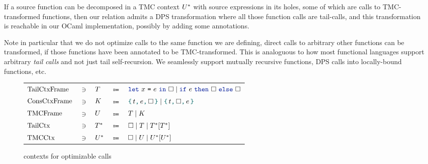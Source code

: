 If a source function can be decomposed in a TMC context $\datalangTMCCtx$ with source expressions in its holes, some of which are calls to TMC-transformed functions, then our relation admits a DPS transformation where all those function calls are tail-calls, and this transformation is reachable in our OCaml implementation, possibly by adding some annotations.

Note in particular that we do not optimize calls to the same function we are defining, direct calls to arbitrary other functions can be transformed, if those functions have been annotated to be TMC-transformed.
This is analoguous to how most functional languages support arbitrary \emph{tail calls} and not just tail self-recursion.
We seamlessly support mutually recursive functions, DPS calls into locally-bound functions, etc.

\begin{figure}[tp]
    \begin{tabular}{lclcl}
            $\datalangTailFrame[]$
            & $\ni$ &
            $\datalangTailFrame$
            & $\Coloneqq$ &
            $\datalangLet {\datalangVar} {\datalangExpr} \datalangCtxHole \mid \datalangIf \datalangExpr \datalangCtxHole \datalangCtxHole$
\\
            $\datalangConsFrame[]$
            & $\ni$ &
            $\datalangConsFrame$
            & $\Coloneqq$ &
            $\datalangBlock \datalangTag \datalangExpr \datalangCtxHole
            \mid \datalangBlock \datalangTag \datalangCtxHole \datalangExpr$
\\
            $\datalangTMCFrame[]$
            & $\ni$ &
            $\datalangTMCFrame$
            & $\Coloneqq$ &
            $\datalangTailFrame
             \mid
             \datalangConsFrame$
\\
            $\datalangTailCtx[]$
            & $\ni$ &
            $\datalangTailCtx$
            & $\Coloneqq$ &
            $\datalangCtxHole
             \mid
             \datalangTailFrame
             \mid
             \datalangTailCtx{[\datalangTailCtx]}$
\\
            $\datalangTMCCtx[]$
            & $\ni$ &
            $\datalangTMCCtx$
            & $\Coloneqq$ &
            $\datalangCtxHole
             \mid
             \datalangTMCFrame
             \mid
             \datalangTMCCtx{[\datalangTMCCtx]}$
    \end{tabular}
    \caption{\DataLang contexts for optimizable calls}
    \label{fig:contexts}
\end{figure}

